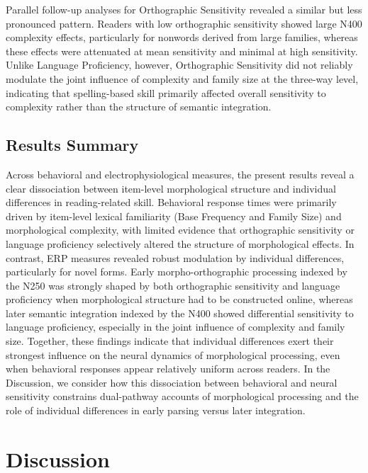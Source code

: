 \documentclass[preprint,12pt, authoryear, review]{elsarticle}
\begin{document}
	Parallel follow-up analyses for Orthographic Sensitivity revealed a similar but less pronounced pattern. Readers with low orthographic sensitivity showed large N400 complexity effects, particularly for nonwords derived from large families, whereas these effects were attenuated at mean sensitivity and minimal at high sensitivity. Unlike Language Proficiency, however, Orthographic Sensitivity did not reliably modulate the joint influence of complexity and family size at the three-way level, indicating that spelling-based skill primarily affected overall sensitivity to complexity rather than the structure of semantic integration.
	
	\subsection{Results Summary}
	Across behavioral and electrophysiological measures, the present results reveal a clear dissociation between item-level morphological structure and individual differences in reading-related skill. Behavioral response times were primarily driven by item-level lexical familiarity (Base Frequency and Family Size) and morphological complexity, with limited evidence that orthographic sensitivity or language proficiency selectively altered the structure of morphological effects. In contrast, ERP measures revealed robust modulation by individual differences, particularly for novel forms. Early morpho-orthographic processing indexed by the N250 was strongly shaped by both orthographic sensitivity and language proficiency when morphological structure had to be constructed online, whereas later semantic integration indexed by the N400 showed differential sensitivity to language proficiency, especially in the joint influence of complexity and family size. Together, these findings indicate that individual differences exert their strongest influence on the neural dynamics of morphological processing, even when behavioral responses appear relatively uniform across readers. In the Discussion, we consider how this dissociation between behavioral and neural sensitivity constrains dual-pathway accounts of morphological processing and the role of individual differences in early parsing versus later integration.
	
	
\section{Discussion}
\end{document}
